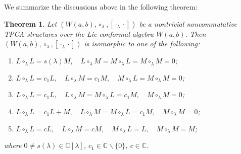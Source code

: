 \documentclass[11pt,letterpaper,reqno]{amsart}
\newtheorem{theorem}{Theorem}[section]
\theoremstyle{definition}
\numberwithin{equation}{section}
\begin{document}
We summarize the discussions above in the following theorem:
\begin{theorem}
Let $(W(a,b),\circ_\lambda,[\cdot_\lambda\cdot])$ be a nontrivial noncommutative TPCA structures over the Lie conformal algebra $W(a,b)$. Then $(W(a,b),\circ_\lambda,[\cdot_\lambda\cdot])$
is isomorphic to one of the following:
\begin{enumerate}
\item[{(1)}] $L\circ_\lambda L= s(\lambda)M,\quad L\circ_\lambda M=M\circ_\lambda L=M\circ_\lambda M=0$;
\item[{(2)}] $L\circ_\lambda L=c_1L,\quad L\circ_\lambda M=c_1M,\quad M\circ_\lambda L=M\circ_\lambda M=0$;
\item[{(3)}] $L\circ_\lambda L=c_1L,\quad L\circ_\lambda M=M\circ_\lambda L=c_1M,\quad M\circ_\lambda M=0$;
\item[{(4)}] $L\circ_\lambda L=c_1L+M,\quad L\circ_\lambda M=M\circ_\lambda L=c_1M,\quad M\circ_\lambda M=0$;
\item[{(5)}] $L\circ_\lambda L=c L,\quad L\circ_\lambda M=c M,\quad M\circ_\lambda L=L,\quad M\circ_\lambda M=M$;
\end{enumerate}
where $0 \neq s(\lambda)\in \mathbb{C} [\lambda]$, $c_1\in \mathbb{C}\backslash\{0\}$, $c\in\mathbb{C}$.
\end{theorem}







\end{document}

